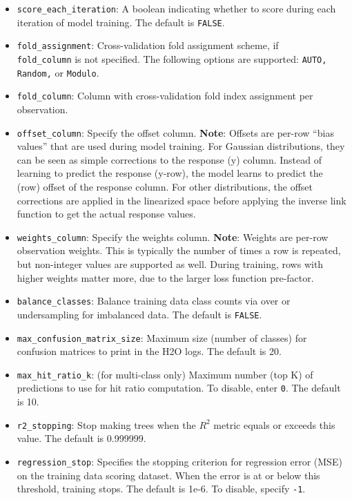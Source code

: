 \begin{itemize}
\item {\texttt{score\_each\_iteration}}: A boolean indicating whether to score during each iteration of model training.  The default is  {\texttt{FALSE}}.
\item \texttt{fold\_assignment}: Cross-validation fold assignment scheme, if  \\ \texttt{fold\_column} is not specified. The following options are supported: \texttt{AUTO, Random,} or \texttt{Modulo}. 
\item \texttt{fold\_column}:  Column with cross-validation fold index assignment per observation. 
\item \texttt{offset\_column}: Specify the offset column. {\textbf{Note}}: Offsets are per-row “bias values” that are used during model training. For Gaussian distributions, they can be seen as simple corrections to the response (y) column. Instead of learning to predict the response (y-row), the model learns to predict the (row) offset of the response column. For other distributions, the offset corrections are applied in the linearized space before applying the inverse link function to get the actual response values. 
\item \texttt{weights\_column}: Specify the weights column. {\textbf{Note}}: Weights are per-row observation weights. This is typically the number of times a row is repeated, but non-integer values are supported as well. During training, rows with higher weights matter more, due to the larger loss function pre-factor.
\item {\texttt{balance\_classes}}: Balance training data class counts via over or undersampling for imbalanced data. The default is {\texttt{FALSE}}.
\item {\texttt{max\_confusion\_matrix\_size}}: Maximum size (number of classes) for confusion matrices to print in the H2O logs.  The default is 20.
\item {\texttt{max\_hit\_ratio\_k}}: (for multi-class only) Maximum number (top K) of predictions to use for hit ratio computation.  To disable, enter  {\texttt{0}}. The default is 10.
\item {\texttt{r2\_stopping}}: Stop making trees when the $R^2$ metric equals or exceeds this value.  The default is 0.999999.
\item \texttt{regression\_stop}: Specifies the stopping criterion for regression error (MSE) on the training data scoring dataset. When the error is at or below this threshold, training stops. The default is 1e-6.  To disable, specify \texttt{-1}.

\end{itemize}
